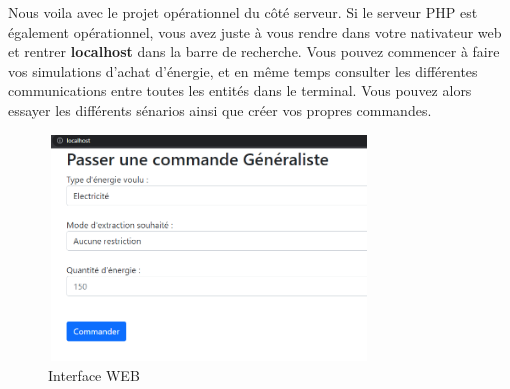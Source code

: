 Nous voila avec le projet opérationnel du côté serveur. Si le serveur PHP est également opérationnel, vous avez juste à vous rendre dans votre nativateur web et rentrer \textbf{localhost} dans la barre de recherche. Vous pouvez commencer à faire vos simulations d'achat d'énergie, et en même temps consulter les différentes communications entre toutes les entités dans le terminal. Vous pouvez alors essayer les différents sénarios ainsi que créer vos propres commandes.
\begin{figure}[h]
    \centering
    \includegraphics[width= 85mm, height=60mm]{images/Localhost.png}
    \caption{Interface WEB}
    \label{img:mesh5}
\end{figure}
\newpage